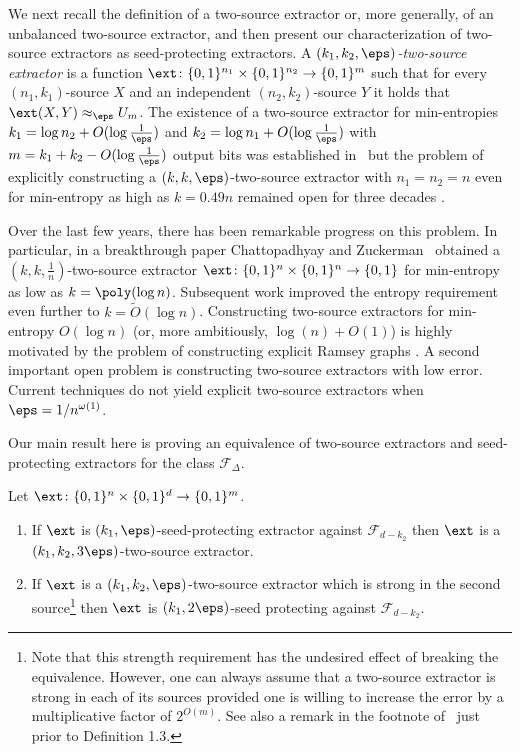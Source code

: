 \documentclass{toc}
\begin{document}
We next recall the definition of a two-source extractor or, more generally, of
an %
unbalanced two-source %
%
extractor,  %
and then present our characterization of two-source extractors as seed-protecting extractors. A \emph{$(k_1,k_2,\eps)$-two-source extractor} is a function $\ext \colon \{0,1\}^{n_1} \times \{0,1\}^{n_2} \to \{0,1\}^m$ such that for every $(n_1,k_1)$-source $X$ and an independent $(n_2,k_2)$-source $Y$ it holds that $\ext(X,Y) \approx_\eps U_m$. The existence of a two-source extractor for min-entropies $k_1 = \log{n_2}+ O(\log\frac1{\eps})$ and $k_2 = \log{n_1} + O(\log\frac1{\eps})$ with $m=k_1+k_2-O(\log\frac1{\eps})$ output bits was established %
%
in~\cite{CG88}  %
but the problem of explicitly constructing a $(k,k,\eps)$-two-source extractor with $n_1 = n_2 = n$ even for min-entropy as high as $k = 0.49n$ remained open for three decades \cite{CG88,Bourgain05,Raz05}.

Over the last few years, there has been remarkable progress on this problem. In particular, in a breakthrough %
paper %
Chattopadhyay and Zuckerman~\cite{CZ19}  obtained a $(k,k,\frac1{n})$-two-source extractor $\ext \colon \{0,1\}^n \times \{0,1\}^n \to \{0,1\}$ for min-entropy as low as $k = \poly(\log{n})$. %
Subsequent  %
work
\cite{BADTS17,Cohen17,Li19} improved the entropy requirement even further to $k = \widetilde{O}(\log{n})$. Constructing two-source extractors for min-entropy $O(\log{n})$ (or, more ambitiously, $\log(n)+O(1)$) is highly motivated by the problem of constructing explicit Ramsey graphs \cite{BKSSW10,BRSW12,Cohen16,Cohen17}. A second important open problem is constructing two-source extractors with low error. Current techniques do not yield explicit two-source extractors when 
%
%
$\eps = 1/n^{\omega(1)}$. 
%



Our main result here is proving an equivalence of two-source extractors and seed-protecting extractors for the class $\mathcal{F}_{\Delta}$.  %
%
%


%
\begin{theorem}  %
\label{thm:two source sp intro}
	Let $\ext \colon \{0,1\}^n \times \{0,1\}^d \to \{0,1\}^m$. 
	\begin{enumerate}
		\item If $\ext$ is $(k_1,\eps)$-seed-protecting extractor against $\mathcal{F}_{d-k_2}$ then $\ext$ is a $(k_1,k_2,3\eps)$-two-source extractor.
		\item If $\ext$ is a $(k_1,k_2,\eps)$-two-source extractor which is strong in the second source\footnote{Note that this %
strength %
requirement has the undesired effect of breaking the equivalence. However, one can always assume that a two-source extractor is strong in each of its sources provided one is willing to increase the error by a multiplicative factor of $2^{O(m)}$. See also a remark in the footnote of~\cite{Raz05} just prior to Definition 1.3.} then $\ext $ is $(k_1,2\eps)$-seed protecting against $\mathcal{F}_{d-k_2}$.
	\end{enumerate}
\end{theorem}
\end{document}
